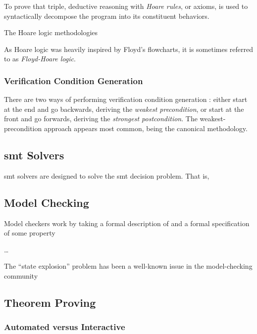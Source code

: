To prove that triple, deductive reasoning with \emph{Hoare rules},%
or axioms, is used to syntactically decompose the program into its constituent behaviors.


The Hoare logic methodologies 

As Hoare logic was heavily inspired by Floyd's flowcharts, it is sometimes referred to
as \emph{Floyd-Hoare logic}.

\subsubsection{Verification Condition Generation}

There are two ways of performing verification condition generation%
:
either start at the end and go backwards, deriving the \emph{weakest precondition},%
or start at the front and go forwards, deriving the \emph{strongest postcondition}.%
The weakest-precondition approach appears most common,
being the canonical methodology.


\subsection{\acs*{smt} Solvers}
\Ac{smt} solvers are designed to solve the \acl{smt} decision problem.
That is, 

\subsection{Model Checking}
Model checkers work by taking a formal description of 
and a formal specification of some property 

\todo\dots

The ``state explosion'' problem has been a well-known issue
in the model-checking community \autocite{clarke2012modelchecking} 

\subsection{Theorem Proving}
%

\subsubsection{Automated versus Interactive}

